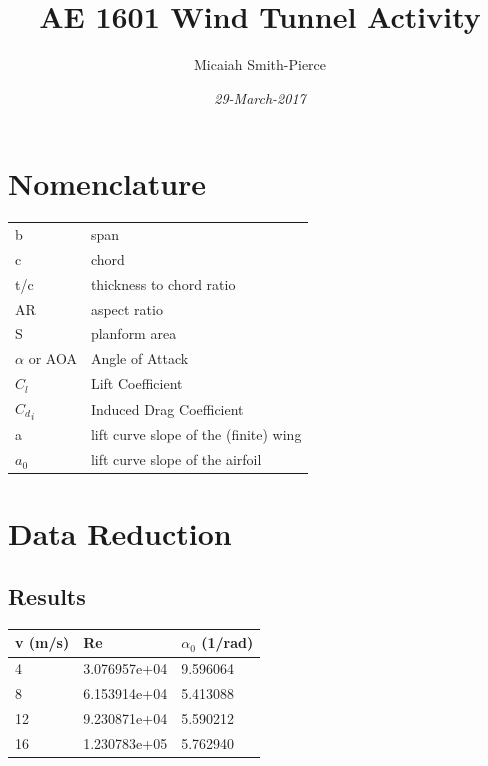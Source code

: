 \documentclass{article}
\title{AE 1601 Wind Tunnel Activity}
\author{Micaiah Smith-Pierce}
\date{\it{29-March-2017}}
\begin{document}
\maketitle

\section*{Nomenclature}
\begin{tabular}{l l}
b & span \\
c & chord \\
t/c & thickness to chord ratio \\
AR & aspect ratio \\
S & planform area \\
$\alpha$ or AOA & Angle of Attack \\
$C_l$ & Lift Coefficient \\
${C_d}_i$ & Induced Drag Coefficient \\
a & lift curve slope of the (finite) wing \\
$a_0$ & lift curve slope of the airfoil \\
\end{tabular}

\section*{Data Reduction}

\subsection*{Results}
\begin{tabular}{l l l}
v (m/s) & Re & $\alpha_0$ (1/rad)\\ \hline
4 & 3.076957e+04 & 9.596064\\
8 & 6.153914e+04 & 5.413088\\
12 & 9.230871e+04 & 5.590212\\
16 & 1.230783e+05 & 5.762940\\
\end{tabular}
\end{document}
